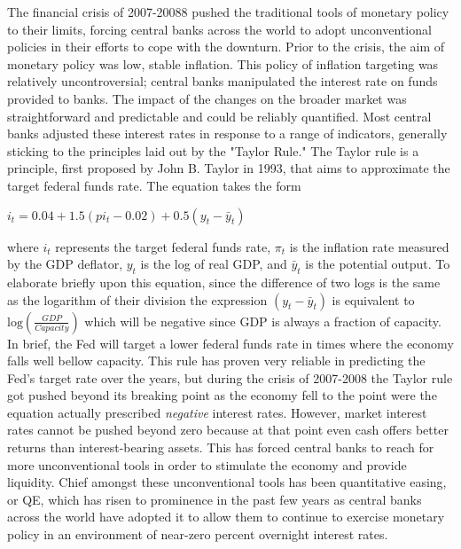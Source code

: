 \documentclass[12pt]{report}
\begin{document}
The financial crisis of 2007-20088 pushed the traditional tools of monetary policy to their limits, forcing central banks across the world to adopt unconventional policies in their efforts to cope with the downturn.
Prior to the crisis, the aim of monetary policy was low, stable inflation. This policy of inflation targeting was relatively uncontroversial; central banks manipulated the interest rate on funds provided to banks.
The impact of the changes on the broader market was straightforward and predictable and could be reliably quantified.\autocite[271]{joyce2012quantitative}
Most central banks adjusted these interest rates in response to a range of indicators, generally sticking to the principles laid out by the "Taylor Rule."\autocite[271]{joyce2012quantitative}
The Taylor rule is a principle, first proposed by John B. Taylor in 1993, that aims to approximate the target federal funds rate.\autocite[232]{woodford2001taylor}
The equation takes the form
\begin{center}
$i_t = 0.04 + 1.5(pi_t -0.02) + 0.5(y_t - \bar{y}_t)$
\end{center}
where $i_t$ represents the target federal funds rate, $\pi_t$ is the inflation rate measured by the GDP deflator, $y_t$ is the log of real GDP, and $\bar{y}_t$ is the potential output.\autocite[232]{woodford2001taylor}
To elaborate briefly upon this equation, since the difference of two logs is the same as the logarithm of their division the expression $(y_t - \bar{y}_t)$ is equivalent to $\mbox{log}(\frac{GDP}{Capacity})$ which will be negative since GDP is always a fraction of capacity.
In brief, the Fed will target a lower federal funds rate in times where the economy falls well bellow capacity.
This rule has proven very reliable in predicting the Fed's target rate over the years,\autocite[232]{woodford2001taylor} but during the crisis of 2007-2008 the Taylor rule got pushed beyond its breaking point as the economy fell to the point were the equation actually prescribed \emph{negative} interest rates.
However, market interest rates cannot be pushed beyond zero because at that point even cash offers better returns than interest-bearing assets.\autocite[272]{joyce2012quantitative}
This has forced central banks to reach for more unconventional tools in order to stimulate the economy and provide liquidity.
Chief amongst these unconventional tools has been quantitative easing, or QE, which has risen to prominence in the past few years as central banks across the world have adopted it to allow them to continue to exercise monetary policy in an environment of near-zero percent overnight interest rates.
\end{document}
